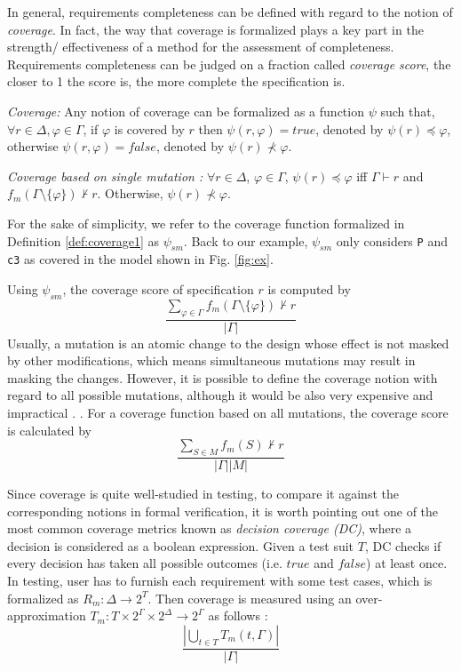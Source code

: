 In general, requirements completeness can be defined with regard to the notion of \emph{coverage}. In fact, the way that coverage is formalized plays a key part in the strength/ effectiveness of a method for the assessment of completeness. Requirements completeness can be judged on a fraction called \emph{coverage score}, the closer to 1 the score is, the more complete the specification is.

\begin{definition}{\emph{Coverage:}}
  \label{def:coverage}
   Any notion of coverage can be formalized as a function $\psi$ such that,
   $\forall r \in \Delta, \varphi \in \Gamma$, if $\varphi$ is covered by $r$ then $\psi (r, \varphi) = true$, denoted by $\psi (r) \preccurlyeq \varphi$, otherwise  $\psi (r, \varphi) = false$, denoted by $\psi (r) \nprec \varphi$.
\end{definition}

\begin{definition} {\emph{Coverage based on single mutation \cite{chockler2010coverage, chockler_coverage_2003}:}}
  \label{def:coverage1}
   $\forall r \in \Delta$,
   $\varphi \in \Gamma$,
   $\psi (r) \preccurlyeq \varphi$
   iff $\Gamma \vdash r$ and
   $f_m (\Gamma \setminus \{ \varphi \}) \nvdash r$. Otherwise, $\psi (r) \nprec \varphi$.
\end{definition}

For the sake of simplicity, we refer to the coverage function
formalized in Definition \ref{def:coverage1} as $\psi_{sm}$.
Back to our example, $\psi_{sm}$ only considers {\tt P} and {\tt c3} as covered in the model shown in Fig. \ref{fig:ex}.

Using $\psi_{sm}$, the coverage score of specification $r$ is computed by $$\frac{\sum_{\varphi \in \Gamma} f_m (\Gamma \setminus \{ \varphi \}) \nvdash r}{|\Gamma|}$$
Usually, a mutation is an atomic change to the design whose effect is not masked by other modifications, which means simultaneous mutations may result in masking the changes. However,
it is possible to define the coverage notion with regard to all possible mutations, although it would be also very expensive and impractical \cite{chockler2001practical}. .
For a coverage function based on all mutations, the coverage score is calculated by
$$ \frac{\sum_{S \in M} f_m (S) \nvdash r}{|\Gamma| |M|}$$

Since coverage is quite well-studied in testing, to compare it against the corresponding notions in formal verification, it is worth pointing out one of the most common coverage metrics known as \emph{decision coverage (DC)}, where a decision is considered as a boolean expression.  Given a test suit $T$, DC checks if every decision has taken all possible outcomes (i.e. $true$ and $false$) at least once. In testing, user has to furnish each requirement with some test cases, which is formalized as $R_m : \Delta \rightarrow 2^T$. Then coverage is measured using an over-approximation $T_m : T \times 2^\Gamma \times 2^\Delta \rightarrow 2^\Gamma$ as follows \cite{chelenski1994oapplicability, schuler_assessing_2011, murugesan2015we}: $$\frac{|\bigcup_{t \in T} T_m (t, \Gamma)|}{|\Gamma|}$$

